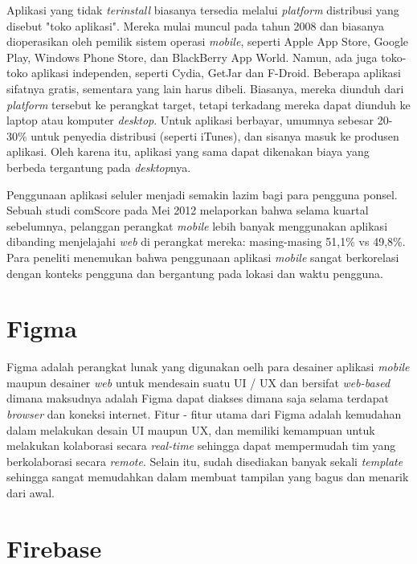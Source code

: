 Aplikasi yang tidak \textit{terinstall} biasanya tersedia melalui \textit{platform} distribusi yang disebut "toko aplikasi". Mereka mulai muncul pada tahun 2008 dan biasanya dioperasikan oleh pemilik sistem operasi \textit{mobile}, seperti Apple App Store, Google Play, Windows Phone Store, dan BlackBerry App World. Namun, ada juga toko-toko aplikasi independen, seperti Cydia, GetJar dan F-Droid. Beberapa aplikasi sifatnya gratis, sementara yang lain harus dibeli. Biasanya, mereka diunduh dari \textit{platform} tersebut ke perangkat target, tetapi terkadang mereka dapat diunduh ke laptop atau komputer \textit{desktop}. Untuk aplikasi berbayar, umumnya sebesar 20-30\% untuk penyedia distribusi (seperti iTunes), dan sisanya masuk ke produsen aplikasi. Oleh karena itu, aplikasi yang sama dapat dikenakan biaya yang berbeda tergantung pada \textit{desktop}nya.
\vspace{0.5ex}

Penggunaan aplikasi seluler menjadi semakin lazim bagi para pengguna ponsel. Sebuah studi comScore pada Mei 2012 melaporkan bahwa selama kuartal sebelumnya, pelanggan perangkat \textit{mobile} lebih banyak menggunakan aplikasi dibanding menjelajahi \textit{web} di perangkat mereka: masing-masing 51,1\% vs 49,8\%. Para peneliti menemukan bahwa penggunaan aplikasi \textit{mobile} sangat berkorelasi dengan konteks pengguna dan bergantung pada lokasi dan waktu pengguna.

\section{Figma}

Figma adalah perangkat lunak yang digunakan oelh para desainer aplikasi \textit{mobile} maupun desainer \textit{web} untuk mendesain suatu UI / UX dan bersifat \textit{web-based} dimana maksudnya adalah Figma dapat diakses dimana saja selama terdapat \textit{browser} dan koneksi internet. Fitur - fitur utama dari Figma adalah kemudahan dalam melakukan desain UI maupun UX, dan memiliki kemampuan untuk melakukan kolaborasi secara \textit{real-time} sehingga dapat mempermudah tim yang berkolaborasi secara \textit{remote}. Selain itu, sudah disediakan banyak sekali \textit{template} sehingga sangat memudahkan dalam membuat tampilan yang bagus dan menarik dari awal.

\section{Firebase}


